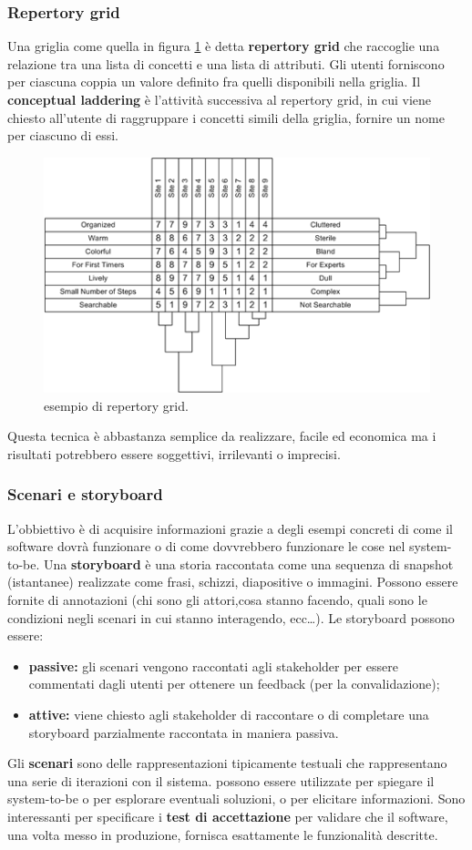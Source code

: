 \subsubsection{Repertory grid} Una griglia come quella in figura \ref{fig:repertorygrid} è detta \textbf{repertory grid} che raccoglie una relazione tra una lista di concetti e una lista di attributi. Gli utenti forniscono per ciascuna coppia un valore definito fra quelli disponibili nella griglia. Il \textbf{conceptual laddering} è l'attività successiva al repertory grid, in cui viene chiesto all'utente di raggruppare i concetti simili della griglia, fornire un nome per ciascuno di essi.
\begin{figure}[th]
	\centering
	\includegraphics[width=0.7\linewidth]{img/repertory_grid}
	\caption{esempio di repertory grid.}
	\label{fig:repertorygrid}
\end{figure}
Questa tecnica è abbastanza semplice da realizzare, facile ed economica ma i risultati potrebbero essere soggettivi, irrilevanti o imprecisi.
\subsubsection{Scenari e storyboard}
L'obbiettivo è di acquisire informazioni grazie a degli esempi concreti di come il software dovrà funzionare o di come dovvrebbero funzionare le cose nel system-to-be.
Una \textbf{storyboard} è una storia raccontata come una sequenza di snapshot (istantanee) realizzate come frasi, schizzi, diapositive o immagini. Possono essere fornite di annotazioni (chi sono gli attori,cosa stanno facendo, quali sono le condizioni negli scenari in cui stanno interagendo, ecc\dots). Le storyboard possono essere: \begin{itemize}
	\item \textbf{passive:} gli scenari vengono raccontati agli stakeholder per essere commentati dagli utenti per ottenere un feedback (per la convalidazione);
	\item \textbf{attive:} viene chiesto agli stakeholder di raccontare o di completare una storyboard parzialmente raccontata in maniera passiva.
\end{itemize}

Gli \textbf{scenari} sono delle rappresentazioni tipicamente testuali che rappresentano una serie di iterazioni con il sistema. possono essere utilizzate per spiegare il system-to-be o per esplorare eventuali soluzioni, o per elicitare informazioni. Sono interessanti per specificare i \textbf{test di accettazione} per validare che il software, una volta messo in produzione, fornisca esattamente le funzionalità descritte.



